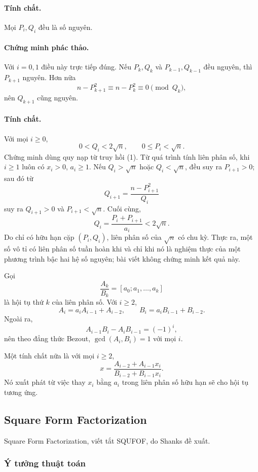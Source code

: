 \documentclass[11pt]{article}
\begin{document}
\paragraph{Tính chất.}
Mọi \(P_i,Q_i\) đều là số nguyên.

\paragraph{Chứng minh phác thảo.}
Với \(i=0,1\) điều này trực tiếp đúng. Nếu \(P_k,Q_k\) và
\(P_{k-1},Q_{k-1}\) đều nguyên, thì \(P_{k+1}\) nguyên. Hơn nữa
\[
  n-P_{k+1}^2\equiv n-P_k^2\equiv 0\pmod {Q_k},
\]
nên \(Q_{k+1}\) cũng nguyên.

\paragraph{Tính chất.}
Với mọi \(i\ge 0\),
\[
  0<Q_i<2\sqrt n,\qquad 0\le P_i<\sqrt n.
\]
Chứng minh dùng quy nạp từ truy hồi (1). Từ quá trình tính liên phân số, khi
\(i\ge 1\) luôn có \(x_i>0\), \(a_i\ge 1\). Nếu \(Q_i>\sqrt n\) hoặc
\(Q_i<\sqrt n\), đều suy ra \(P_{i+1}>0\); sau đó từ
\[
  Q_{i+1}=\frac{n-P_{i+1}^2}{Q_i}
\]
suy ra \(Q_{i+1}>0\) và \(P_{i+1}<\sqrt n\). Cuối cùng,
\[
  Q_i=\frac{P_i+P_{i+1}}{a_i}<2\sqrt n.
\]
Do chỉ có hữu hạn cặp \((P_i,Q_i)\), liên phân số của \(\sqrt n\) có chu kỳ.
Thực ra, một số vô tỉ có liên phân số tuần hoàn khi và chỉ khi nó là nghiệm
thực của một phương trình bậc hai hệ số nguyên; bài viết không chứng minh kết
quả này.

Gọi
\[
  \frac{A_k}{B_k}=[a_0;a_1,\ldots,a_k]
\]
là hội tụ thứ \(k\) của liên phân số. Với \(i\ge 2\),
\[
  A_i=a_iA_{i-1}+A_{i-2},\qquad
  B_i=a_iB_{i-1}+B_{i-2}. \tag{2}
\]
Ngoài ra,
\[
  A_{i-1}B_i-A_iB_{i-1}=(-1)^i,
\]
nên theo đẳng thức Bezout, \(\gcd(A_i,B_i)=1\) với mọi \(i\).

Một tính chất nữa là với mọi \(i\ge 2\),
\[
  x=\frac{A_{i-2}+A_{i-1}x_i}{B_{i-2}+B_{i-1}x_i}.
\]
Nó xuất phát từ việc thay \(x_i\) bằng \(a_i\) trong liên phân số hữu hạn sẽ
cho hội tụ tương ứng.

\subsection{Square Form Factorization}

Square Form Factorization, viết tắt SQUFOF, do Shanks đề xuất.

\subsubsection{Ý tưởng thuật toán}
\end{document}
